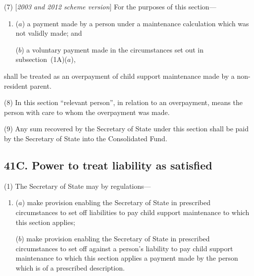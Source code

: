 \documentclass[12pt,a4paper]{article}
\begin{document}
(7) [\emph{2003 and 2012 scheme version}] For the purposes of this section—
\begin{enumerate}\item[]
($a$) a payment made by a person under a maintenance calculation which was not validly made; and

($b$) a voluntary payment made in the circumstances set out in subsection~(1A)($a$),
\end{enumerate}
shall be treated as an overpayment of child support maintenance made by a non-resident parent.

(8) In this section “relevant person”, in relation to an overpayment, means the person with care to whom the overpayment was made.

(9) Any sum recovered by the 
Secretary of State  %
under this section shall be paid by 
the Secretary of State  %
into the Consolidated Fund.


\subsection{41C. Power to treat liability as satisfied}

(1) The Secretary of State may by regulations---
\begin{enumerate}\item[]
($a$) make provision enabling the 
Secretary of State  %
in prescribed circumstances to set off liabilities to pay child support maintenance to which this section applies;

($b$) make provision enabling the Secretary of State  %
in prescribed circumstances to set off against a person’s liability to pay child support maintenance to which this section applies a payment made by the person which is of a prescribed description.
\end{enumerate}
\end{document}
